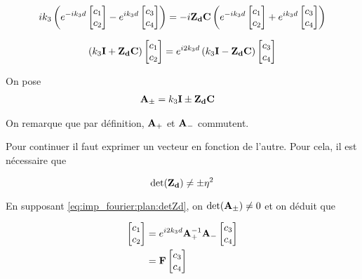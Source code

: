 \begin{equation}
    ik_3\left( e^{-ik_3 d}
    \begin{bmatrix}
        c_1 \\
        c_2
    \end{bmatrix}
    -e^{ik_3 d}
    \begin{bmatrix}
        c_3 \\
        c_4
    \end{bmatrix}
    \right)
    =-i\mathbf{Z_d}\mathbf{C}
    \left(
        e^{-ik_3 d}
        \begin{bmatrix}
            c_1 \\
            c_2
        \end{bmatrix}
        +e^{ik_3 d}
        \begin{bmatrix}
            c_3 \\
            c_4
        \end{bmatrix}
    \right)
\end{equation}

\begin{equation}
    \left(k_3\mathbf{I} + \mathbf{Z_d}\mathbf{C}\right)
    \begin{bmatrix}
        c_1 \\
        c_2
    \end{bmatrix}
    = e^{i2k_3 d} \left(k_3\mathbf{I} - \mathbf{Z_d}\mathbf{C}\right)
    \begin{bmatrix}
        c_3 \\
        c_4
    \end{bmatrix}
\end{equation}

On pose
\begin{align}
    \mathbf{A}_\pm &= k_3\mathbf{I} \pm \mathbf{Z_d}\mathbf{C}
\end{align}

On remarque que par définition, $\mathbf{A}_+$ et $\mathbf{A}_-$ commutent.

Pour continuer il faut exprimer un vecteur en fonction de l'autre. Pour cela, il est nécessaire que 

\begin{equation}
    \det(\mathbf{Z_d}) \not = \pm \eta^2
    \label{eq:imp_fourier:plan:detZd}
\end{equation}


En supposant \eqref{eq:imp_fourier:plan:detZd}, on $\det(\mathbf{A}_\pm) \not = 0 $ et on déduit que

\begin{align}
    \begin{bmatrix}
        c_1 \\
        c_2
    \end{bmatrix}
    &= e^{i2 k_3 d} \mathbf{A}_+^{-1}\mathbf{A}_-
    \begin{bmatrix}
        c_3 \\
        c_4
    \end{bmatrix}
    \\
    & = \mathbf{F}
    \begin{bmatrix}
        c_3 \\
        c_4
    \end{bmatrix}
\end{align}

